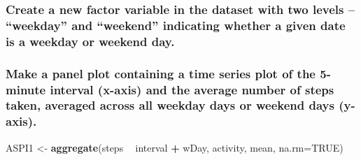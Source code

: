\documentclass[
]{article}
\newenvironment{Shaded}{\begin{snugshade}}{\end{snugshade}}
\newcommand{\DataTypeTok}[1]{\textcolor[rgb]{0.13,0.29,0.53}{#1}}
\newcommand{\KeywordTok}[1]{\textcolor[rgb]{0.13,0.29,0.53}{\textbf{#1}}}
\newcommand{\NormalTok}[1]{#1}
\newcommand{\OperatorTok}[1]{\textcolor[rgb]{0.81,0.36,0.00}{\textbf{#1}}}
\newcommand{\OtherTok}[1]{\textcolor[rgb]{0.56,0.35,0.01}{#1}}
\newcommand{\StringTok}[1]{\textcolor[rgb]{0.31,0.60,0.02}{#1}}
\begin{document}
\hypertarget{create-a-new-factor-variable-in-the-dataset-with-two-levels-weekday-and-weekend-indicating-whether-a-given-date-is-a-weekday-or-weekend-day.}{%
\subsubsection{Create a new factor variable in the dataset with two
levels -- ``weekday'' and ``weekend'' indicating whether a given date is
a weekday or weekend
day.}\label{create-a-new-factor-variable-in-the-dataset-with-two-levels-weekday-and-weekend-indicating-whether-a-given-date-is-a-weekday-or-weekend-day.}}

\begin{Shaded}
\end{Shaded}

\hypertarget{make-a-panel-plot-containing-a-time-series-plot-of-the-5-minute-interval-x-axis-and-the-average-number-of-steps-taken-averaged-across-all-weekday-days-or-weekend-days-y-axis.}{%
\subsubsection{Make a panel plot containing a time series plot of the
5-minute interval (x-axis) and the average number of steps taken,
averaged across all weekday days or weekend days
(y-axis).}\label{make-a-panel-plot-containing-a-time-series-plot-of-the-5-minute-interval-x-axis-and-the-average-number-of-steps-taken-averaged-across-all-weekday-days-or-weekend-days-y-axis.}}

\begin{Shaded}
\begin{Highlighting}[]
\NormalTok{ASPI1 <-}\StringTok{ }\KeywordTok{aggregate}\NormalTok{(steps }\OperatorTok{~}\StringTok{ }\NormalTok{interval }\OperatorTok{+}\StringTok{ }\NormalTok{wDay, activity, mean, }\DataTypeTok{na.rm=}\OtherTok{TRUE}\NormalTok{)}
\end{Highlighting}
\end{Shaded}
\end{document}
